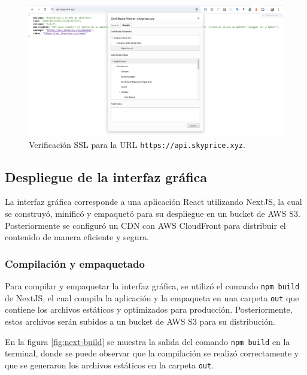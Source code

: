 \begin{figure}[H]
    \centering
    \includegraphics[width=1.0\textwidth]{imagenes/05-implementacion/despliegue/eb-ssl.png}
    \caption{Verificación SSL para la URL \texttt{https://api.skyprice.xyz}.}
    \label{fig:api-skyprice-xyz}
\end{figure}

\subsection{Despliegue de la interfaz gráfica}
La interfaz gráfica corresponde a una aplicación React utilizando NextJS, la cual
se construyó, minificó y empaquetó para su despliegue en un bucket de AWS S3. Posteriormente
se configuró un CDN con AWS CloudFront para distribuir el contenido de manera eficiente y segura.

\subsubsection{Compilación y empaquetado}
Para compilar y empaquetar la interfaz gráfica, se utilizó el comando \texttt{npm build}
de NextJS, el cual compila la aplicación y la empaqueta en una carpeta \texttt{out}
que contiene los archivos estáticos y optimizados para producción. Posteriormente,
estos archivos serán subidos a un bucket de AWS S3 para su distribución.

En la figura \ref{fig:next-build} se muestra la salida del comando \texttt{npm build}
en la terminal, donde se puede observar que la compilación se realizó correctamente y
que se generaron los archivos estáticos en la carpeta \texttt{out}.

